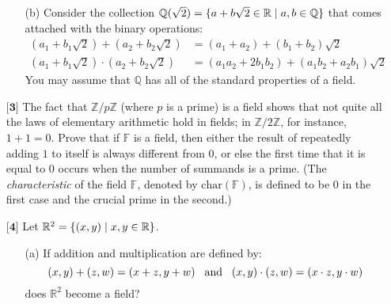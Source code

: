 \documentclass[12pt]{article}
\begin{document}
\begin{itemize}
\begin{itemize}
    \vspace{.3cm}
    \item[(b)]
    Consider the collection $\mathbb{Q}(\sqrt{2}) = \{a + b\sqrt{2} \in \mathbb{R} \hspace{.1cm} | \hspace{.1cm} a,b \in \mathbb{Q}\}$ that comes attached with the binary operations:
    \begin{equation*}
    \begin{split}
    (a_1 + b_1\sqrt{2}) + (a_2 + b_2\sqrt{2}) &= (a_1 + a_2) + (b_1 + b_2)\sqrt{2} \\
    (a_1 + b_1\sqrt{2}) \cdot (a_2 + b_2\sqrt{2}) &= (a_1a_2 + 2b_1b_2) + (a_1b_2 + a_2b_1)\sqrt{2}
    \end{split}
    \end{equation*}
    You may assume that $\mathbb{Q}$ has all of the standard properties of a field. 
    
    \end{itemize}
    
    \vspace{.5cm}
    
    \item[$\textbf{[3]}$]
    The fact that $\mathbb{Z}/p\mathbb{Z}$ (where $p$ is a prime) is a field shows that not quite all the laws of elementary arithmetic hold in fields; in $\mathbb{Z}/2\mathbb{Z}$, for instance, $1 + 1 = 0$. Prove that if $\mathbb{F}$ is a field, then either the result of repeatedly adding $1$ to itself is always different from $0$, or else the first time that it is equal to $0$ occurs when the number of summands is a prime. (The \textit{characteristic} of the field $\mathbb{F}$, denoted by $\text{char}(\mathbb{F})$, is defined to be $0$ in the first case and the crucial prime in the second.) 
    
    \vspace{.5cm}
    
    \item[$\textbf{[4]}$]
    Let $\mathbb{R}^2 = \{ (x,y) \hspace{.1cm} | \hspace{.1cm} x,y \in \mathbb{R} \}$. 
    \begin{itemize}
    
    \vspace{.3cm}
    \item[(a)]
    If addition and multiplication are defined by:
    \begin{equation*}
    (x,y) + (z,w) = (x + z,y + w) \hspace{.3cm} \text{and} \hspace{.3cm} (x,y) \cdot (z,w) = (x \cdot z,y \cdot w)
    \end{equation*}
    does $\mathbb{R}^2$ become a field?
    

\end{itemize}
\end{itemize}
\end{document}

